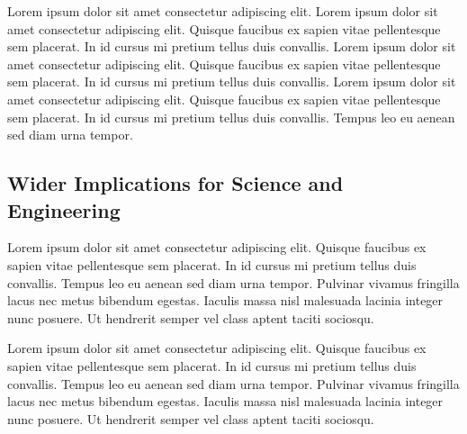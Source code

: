 \documentclass[sigconf,nonacm]{acmart} %
\begin{document}
Lorem ipsum dolor sit amet consectetur adipiscing elit.
Lorem ipsum dolor sit amet consectetur adipiscing elit. Quisque faucibus ex sapien vitae pellentesque sem placerat. In id cursus mi pretium tellus duis convallis.
Lorem ipsum dolor sit amet consectetur adipiscing elit. Quisque faucibus ex sapien vitae pellentesque sem placerat. In id cursus mi pretium tellus duis convallis.
Lorem ipsum dolor sit amet consectetur adipiscing elit. Quisque faucibus ex sapien vitae pellentesque sem placerat. In id cursus mi pretium tellus duis convallis. Tempus leo eu aenean sed diam urna tempor.

\subsection{Wider Implications for Science and Engineering}
\label{subsec:implications}

Lorem ipsum dolor sit amet consectetur adipiscing elit. 
Quisque faucibus ex sapien vitae pellentesque sem placerat. 
In id cursus mi pretium tellus duis convallis. 
Tempus leo eu aenean sed diam urna tempor. 
Pulvinar vivamus fringilla lacus nec metus bibendum egestas. 
Iaculis massa nisl malesuada lacinia integer nunc posuere. 
Ut hendrerit semper vel class aptent taciti sociosqu.

Lorem ipsum dolor sit amet consectetur adipiscing elit. 
Quisque faucibus ex sapien vitae pellentesque sem placerat. 
In id cursus mi pretium tellus duis convallis. 
Tempus leo eu aenean sed diam urna tempor. 
Pulvinar vivamus fringilla lacus nec metus bibendum egestas. 
Iaculis massa nisl malesuada lacinia integer nunc posuere. 
Ut hendrerit semper vel class aptent taciti sociosqu.
\end{document}
